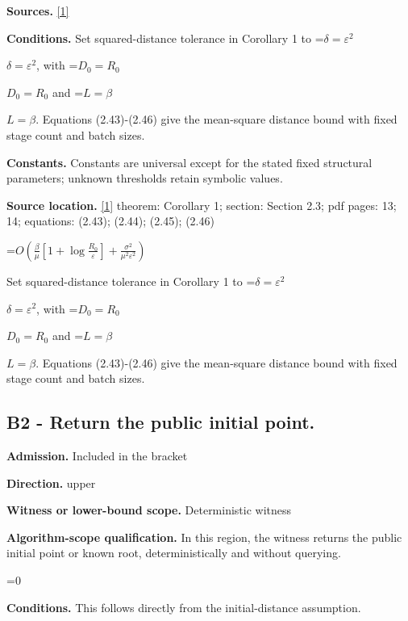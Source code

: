 \documentclass[10pt,a4paper]{article}
\newcommand{\AtlasMath}[1]{\par\begingroup\centering\setbox0=\hbox{$\displaystyle #1$}\ifdim\wd0>1.4\linewidth\typeout{ATLAS WIDE FORMULA: \the\wd0}\fi\ifdim\wd0>\linewidth\resizebox{\linewidth}{!}{\box0}\else\box0\fi\par\endgroup}
\newcommand{\AtlasInlineMath}[1]{\begingroup\setbox0=\hbox{$#1$}\ifdim\wd0>.4\linewidth\endgroup\AtlasMath{#1}\else\endgroup$#1$\fi}
\begin{document}
\textbf{Sources.} \href{https://arxiv.org/pdf/2609.04188v2}{[1]}



\textbf{Conditions.} Set squared-distance tolerance in Corollary 1 to \AtlasInlineMath{\delta=\varepsilon^2}, with \AtlasInlineMath{D_0=R_0} and \AtlasInlineMath{L=\beta}. Equations (2.43)-(2.46) give the mean-square distance bound with fixed stage count and batch sizes.



\textbf{Constants.} Constants are universal except for the stated fixed structural parameters; unknown thresholds retain symbolic values.



\textbf{Source location.} \href{https://arxiv.org/pdf/2609.04188v2}{[1]} theorem: Corollary 1; section: Section 2.3; pdf pages: 13; 14; equations: (2.43); (2.44); (2.45); (2.46)



\AtlasMath{O\!\left(\frac{\beta}{\mu}\left[1+\log\frac{R_0}{\varepsilon}\right]+\frac{\sigma^2}{\mu^2\varepsilon^2}\right)}


Set squared-distance tolerance in Corollary 1 to \AtlasInlineMath{\delta=\varepsilon^2}, with \AtlasInlineMath{D_0=R_0} and \AtlasInlineMath{L=\beta}. Equations (2.43)-(2.46) give the mean-square distance bound with fixed stage count and batch sizes.



\subsection{B2 - Return the public initial point.}


\textbf{Admission.} Included in the bracket



\textbf{Direction.} upper



\textbf{Witness or lower-bound scope.} Deterministic witness



\textbf{Algorithm-scope qualification.} In this region, the witness returns the public initial point or known root, deterministically and without querying.



\AtlasMath{0}


\textbf{Conditions.} This follows directly from the initial-distance assumption.
\end{document}
